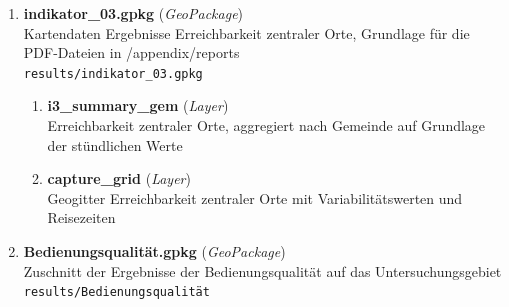\begin{enumerate}[label=\arabic*, leftmargin=*, itemsep=0.5em, topsep=0.3em]
\begin{enumerate}[label=\arabic{enumi}.\arabic*, leftmargin=*, itemsep=0.5em, topsep=0.3em]
\texttt{\small results/indikator\_02.gpkg}
\begin{enumerate}[label=\arabic{enumi}.\arabic{enumii}.\arabic*, leftmargin=*, itemsep=0.5em, topsep=0.3em]
\item \textbf{i2aggregated\_hourly\_2026-05-04\_2026-06-26\_20260518} \textnormal{(\textit{Layer})}\\
Erschließungsqualität, aggregiert nach Gemeinde auf Grundlage der stündlichen Werte mit Bevölkerungsanteilen und Abweichung vom Soll
\item \textbf{i2grid\_hourly\_2026-05-04\_2026-06-26\_20260518} \textnormal{(\textit{Layer})}\\
Geogitter Erschließungsqualität mit Variabilitätswerten und Bevölkerungsdaten
\end{enumerate}
\item \textbf{indikator\_03.gpkg} \textnormal{(\textit{GeoPackage})}\\
Kartendaten Ergebnisse Erreichbarkeit zentraler Orte, Grundlage für die PDF-Dateien in /appendix/reports\\
\texttt{\small results/indikator\_03.gpkg}
\begin{enumerate}[label=\arabic{enumi}.\arabic{enumii}.\arabic*, leftmargin=*, itemsep=0.5em, topsep=0.3em]
\item \textbf{i3\_summary\_gem} \textnormal{(\textit{Layer})}\\
Erreichbarkeit zentraler Orte, aggregiert nach Gemeinde auf Grundlage der stündlichen Werte
\item \textbf{capture\_grid} \textnormal{(\textit{Layer})}\\
Geogitter Erreichbarkeit zentraler Orte mit Variabilitätswerten und Reisezeiten
\end{enumerate}
\item \textbf{Bedienungsqualität.gpkg} \textnormal{(\textit{GeoPackage})}\\
Zuschnitt der Ergebnisse der Bedienungsqualität auf das Untersuchungsgebiet\\
\texttt{\small results/Bedienungsqualität}
\end{enumerate}
\end{enumerate}
